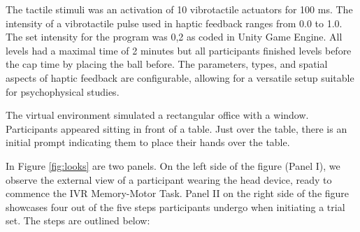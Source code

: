 \documentclass[12pt,oneside,openright]{report}
\begin{document}
The tactile stimuli was an activation of 10 vibrotactile actuators for 100 ms. The intensity of a vibrotactile pulse used in haptic feedback ranges from 0.0 to 1.0. The set intensity for the program was 0,2 as coded in Unity Game Engine. All levels had a maximal time of 2 minutes but all participants finished levels before the cap time by placing the ball before. The parameters, types, and spatial aspects of haptic feedback are configurable, allowing for a versatile setup suitable for psychophysical studies.

The virtual environment simulated a rectangular office with a window. Participants appeared sitting in front of a table. Just over the table, there is an initial prompt indicating them to place their hands over the table. 

In Figure \ref{fig:looks} are two panels. On the left side of the figure (Panel I), we observe the external view of a participant wearing the head device, ready to commence the IVR Memory-Motor Task. Panel II on the right side of the figure showcases four out of the five steps participants undergo when initiating a trial set. The steps are outlined below:
\end{document}
